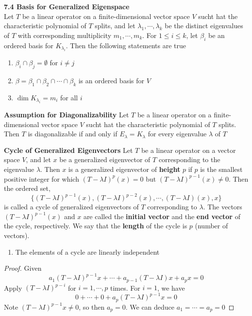\documentclass[11pt]{article}
\begin{document}
\begin{theorem*}
    \textbf{7.4 Basis for Generalized Eigenspace} \\
    Let $T$ be a linear operator on a finite-dimensional vector space $V$ sucht hat the characteristic polynomial of $T$ splits, and let $\lambda_1, \cdots, \lambda_k$ be the distinct eigenvalues of $T$ with corresponding multiplicity $m_1,\cdots, m_k$. For $1\leq i \leq k$, let $\beta_i$ be an ordered basis for $K_{\lambda_i}$. Then the following statements are true 
    \begin{enumerate}
        \item $\beta_i \cap \beta_j = \emptyset$ for $i\neq j$ 
        \item $\beta = \beta_1 \cap \beta_2 \cap \cdots \cap \beta_k$ is an ordered basis for $V$
        \item $\dim{K_{\lambda_i}} = m_i$ for all $i$
    \end{enumerate} 
\end{theorem*}

\begin{corollary*}
    \textbf{Assumption for Diagonalizability} Let $T$ be a linear operator on a finite-dimensional vector space $V$ sucht hat the characteristic polynomial of $T$ splits. Then $T$ is diagonalizable if and only if $E_{\lambda} = K_{\lambda}$ for every eigenvalue $\lambda$ of $T$
\end{corollary*}

\begin{defn*}
    \textbf{Cycle of Generalized Eigenvectors} Let $T$ be a linear operator on a vector space $V$, and let $x$ be a generalized eigenvector of $T$ corresponding to the eigenvalue $\lambda$. Then $x$ is a generalized eigenvector of \textbf{height} $p$ if $p$ is the smallest positive integer for which $(T-\lambda I)^p (x) = 0$ but $(T-\lambda I)^{p-1} (x) \neq 0$. Then the ordered set,
    \[
        \{ (T-\lambda I)^{p-1}(x), (T-\lambda I)^{p-2}(x), \cdots, (T-\lambda I)(x), x \}
    \]
    is called a cycle of generalized eigenvectors of $T$  corresponding to $\lambda$. The vectors $(T-\lambda I)^{p-1}(x)$ and $x$ are called the \textbf{initial vector} and the \textbf{end vector} of the cycle, respectively. We say that the \textbf{length} of the cycle is $p$ (number of vectors). 
    \begin{enumerate}
        \item The elements of a cycle are linearly independent
    \end{enumerate}
    \begin{proof}
        Given 
        \[
            a_1 (T-\lambda I)^{p-1} x + \cdots + a_{p-1}(T-\lambda I)    x + a_p x = 0
        \]
        Apply $(T-\lambda I)^{p-i}$ for $i = 1, \cdots, p$ times. For $i=1$, we have
        \[
            0 + \cdots + 0 + a_p (T-\lambda I)^{p-1}x = 0    
        \]
        Note $(T-\lambda I)^{p-1}x \neq 0$, so then $a_p = 0$. We can deduce $a_1 = \cdots = a_p = 0$
    \end{proof}
\end{defn*}
\end{document}
